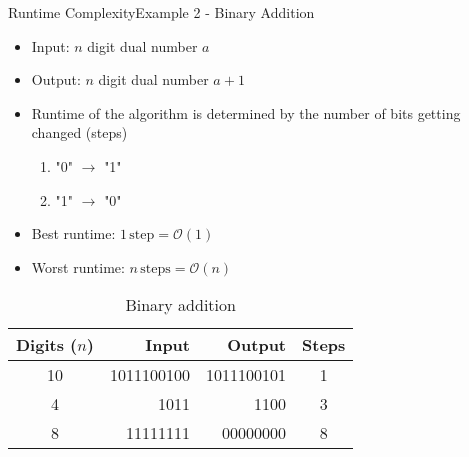 
\begin{frame}{Runtime Complexity}{Example 2 - Binary Addition}
  \begin{itemize}
    \item
      Input: $n$ digit dual number $a$
    \item
      Output: $n$ digit dual number $a + 1$
    \item
      Runtime of the algorithm is determined by the number of bits getting
      changed (steps)
      \begin{enumerate}
        \item "0" $\to$ "1"
        \item "1" $\to$ "0"
      \end{enumerate}
    \item
      {\color{Mittel-Blau}Best runtime:}
      $1\,\text{step} = \mathcal{O}(1)$
    \item
      {\color{Mittel-Blau}Worst runtime:}
      $n\,\text{steps} = \mathcal{O}(n)$
  \end{itemize}
  \vspace{-1.0em}%
  \begin{table}[!h]%
    \caption{Binary addition}%
    \label{tab:runtime:binary_addition}%
    \begin{tabular}{crrc}%
      Digits ($n$) & Input & Output & Steps\\
      \midrule
      10 & 1011100100 & 1011100101 & 1\\
      4 & 1011 & 1100 & 3\\
      8 & 11111111 & 00000000 & 8
    \end{tabular}
  \end{table}
\end{frame}



